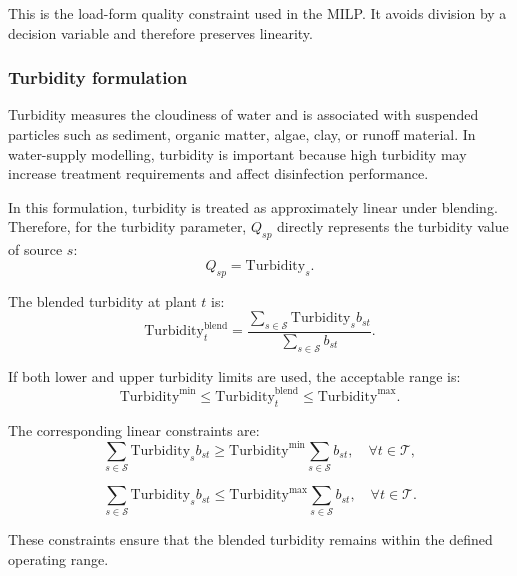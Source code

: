 \documentclass[10pt]{article}
\begin{document}
This is the load-form quality constraint used in the MILP. It avoids division by
a decision variable and therefore preserves linearity.

\subsubsection{Turbidity formulation}

Turbidity measures the cloudiness of water and is associated with suspended
particles such as sediment, organic matter, algae, clay, or runoff material. In
water-supply modelling, turbidity is important because high turbidity may
increase treatment requirements and affect disinfection performance.

In this formulation, turbidity is treated as approximately linear under blending.
Therefore, for the turbidity parameter, $Q_{sp}$ directly represents the turbidity
value of source $s$:
\begin{equation}
    Q_{sp} = \mathrm{Turbidity}_s.
\end{equation}

The blended turbidity at plant $t$ is:
\begin{equation}
    \mathrm{Turbidity}^{\mathrm{blend}}_{t}
    =
    \frac{
    \sum_{s \in \mathcal{S}} \mathrm{Turbidity}_s b_{st}
    }{
    \sum_{s \in \mathcal{S}} b_{st}
    }.
\end{equation}

If both lower and upper turbidity limits are used, the acceptable range is:
\begin{equation}
    \mathrm{Turbidity}^{\min}
    \leq
    \mathrm{Turbidity}^{\mathrm{blend}}_{t}
    \leq
    \mathrm{Turbidity}^{\max}.
\end{equation}

The corresponding linear constraints are:
\begin{equation}
    \sum_{s \in \mathcal{S}} \mathrm{Turbidity}_s b_{st}
    \geq
    \mathrm{Turbidity}^{\min}
    \sum_{s \in \mathcal{S}} b_{st},
    \quad \forall t \in \mathcal{T},
\end{equation}

\begin{equation}
    \sum_{s \in \mathcal{S}} \mathrm{Turbidity}_s b_{st}
    \leq
    \mathrm{Turbidity}^{\max}
    \sum_{s \in \mathcal{S}} b_{st},
    \quad \forall t \in \mathcal{T}.
\end{equation}

These constraints ensure that the blended turbidity remains within the defined
operating range.
\end{document}
